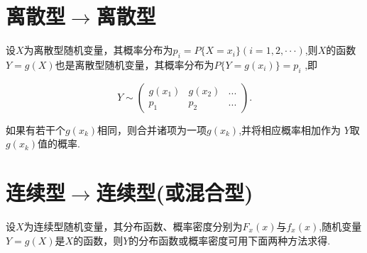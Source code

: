 
\section{离散型$\rightarrow$离散型}
设$X$为离散型随机变量，其概率分布为$p_i=P\{X=x_i\}(i=1,2,\cdotp\cdotp\cdotp)$,则$X$的函数$Y=g(X)$也是离散型随机变量，其概率分布为$P\{Y=g(x_i)\}=p_i$ ,即

$$Y\sim\begin{pmatrix}g(x_1)&g(x_2)&...\\p_1&p_2&...\end{pmatrix}.$$

如果有若干个$g(x_k)$相同，则合并诸项为一项$g(x_k)$,并将相应概率相加作为 $Y$取 $g(x_k)$值的概率.
\section{连续型$\rightarrow$连续型(或混合型)}
设$X$为连续型随机变量，其分布函数、概率密度分别为$F_x(x)$与$f_x(x)$,随机变量$Y=g(X)$是$X$的函数，则$Y$的分布函数或概率密度可用下面两种方法求得.
